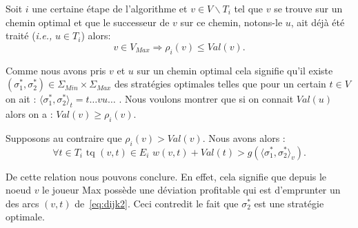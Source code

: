 \begin{demonstration}
\begin{comment}
Par l'absurde supposons :

\begin{align} \exists t \in T_i \text{ tq } w(v,t) + Val(t) < w(v,u) + Val(u) \label{eq:dijk1} \end{align}

Mais cette inégalité signifierait qu'au noeud $v$ le joueur Min ferait mieux d'emprunter l'arc $(v,t)$ plutôt que l'arc $(v,u)$ ce qui contredit le fait que $\sigma_1^*$ est une stratégie optimale vu qu'elle possède une déviation profitable. Cela amène donc bien la contradiction attendue et prouve notre résultat.

Remarquons toutefois qu'il se pourrait qu'au lieu de~\eqref{eq:dijk1} on est : 

$$ \forall t \in T_i \text{ tq } w(v,t) + Val(t) = w(v,u) + Val(u) $$

Mais dans ce cas nous aurions que $\rho_i(v)= w(v,t) + Val(t) = w(v,u) + Val(u) = Val(v)$. 
\end{comment}

\end{demonstration}

\begin{propriete}
	\label{prop:dijk2}
	Soit $i$ une certaine étape de l'algorithme et $v \in V\backslash T_i$ tel que $v$ se trouve sur un chemin optimal et que le successeur de $v$ sur ce chemin, notons-le $u$, ait déjà été traité (\emph{i.e.,} $u \in T_i$) alors:
	$$ v \in V_{Max} \Rightarrow \rho_i(v) \leq Val(v).$$
\end{propriete}

\begin{demonstration} 
	$\text{}$\\
	Comme nous avons pris $v$ et $u$ sur un chemin optimal cela signifie qu'il existe $(\sigma_1^*, \sigma_2^*) \in \Sigma_{Min} \times \Sigma_{Max}$ des stratégies optimales telles que pour un certain $t \in V$ on ait : $\langle \sigma_1^*, \sigma_2^* \rangle_t = t\ldots vu\ldots$ .
Nous voulons montrer que si on connait $Val(u)$ alors on a : $Val(v) \geq \rho_i(v)$.

Supposons au contraire que $ \rho_i(v) > Val(v)$. Nous avons alors : 
\begin{equation} \forall t \in T_i \text{ tq } (v,t)\in E_i \,\, w(v,t) + Val(t) > g(\langle \sigma_1^*, \sigma_2^*\rangle_v). \label{eq:dijk2}\end{equation}

De cette relation nous pouvons conclure. En effet, cela signifie que depuis le noeud $v$ le joueur Max possède une déviation profitable qui est d'emprunter un des arcs $(v,t)$ de~\eqref{eq:dijk2}. Ceci contredit le fait que $\sigma_2^*$ est une stratégie optimale.
	
\end{demonstration}

